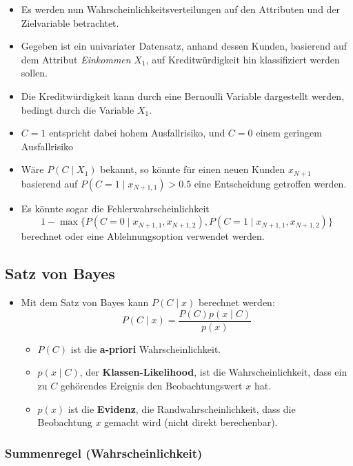 \documentclass{scrartcl}
\begin{document}
\begin{itemize}
	\item Es werden nun Wahrscheinlichkeitsverteilungen auf den Attributen und 
	der Zielvariable betrachtet.
	\item Gegeben ist ein univariater Datensatz, anhand dessen Kunden, 
	basierend auf dem Attribut \textit{Einkommen} $ X_1 $, auf Kreditwürdigkeit 
	hin klassifiziert werden sollen.
	\item Die Kreditwürdigkeit kann durch eine Bernoulli Variable dargestellt 
	werden, bedingt durch die Variable $ X_1 $.
	\item $ C=1 $ entspricht dabei hohem Ausfallrisiko, und $ C=0 $ einem 
	geringem Ausfallrisiko
	\item Wäre $ P(C \mid X_1) $ bekannt, so könnte für einen neuen Kunden $ 
	x_{N+1} $ basierend auf $ P(C=1 \mid x_{N+1,1}) > 0.5 $ eine Entscheidung 
	getroffen werden.
	\item Es könnte sogar die Fehlerwahrscheinlichkeit
	\[ 1 - \max \{ P(C=0 \mid x_{N+1,1}, x_{N+1,2}), P(C=1 \mid x_{N+1,1}, 
	x_{N+1,2}) \} \]
	berechnet oder eine Ablehnungsoption verwendet werden.
\end{itemize}

\subsection{Satz von Bayes}

\begin{itemize}
	\item Mit dem Satz von Bayes kann $ P(C \mid x) $ berechnet werden:
	\[ P(C \mid x) = \frac{P(C) p(x \mid C)}{p(x)} \]
	\begin{itemize}
		\item $ P(C) $ ist die \textbf{a-priori} Wahrscheinlichkeit.
		\item $ p(x \mid C) $, der \textbf{Klassen-Likelihood}, ist die 
		Wahrscheinlichkeit, dass ein zu $ C $ gehörendes Ereignis den 
		Beobachtungswert $ x $ hat.
		\item $ p(x) $ ist die \textbf{Evidenz}, die Randwahrscheinlichkeit, 
		dass die Beobachtung $ x $ gemacht wird (nicht direkt berechenbar).
	\end{itemize}
\end{itemize}

\subsubsection{Summenregel (Wahrscheinlichkeit)}
\end{document}
